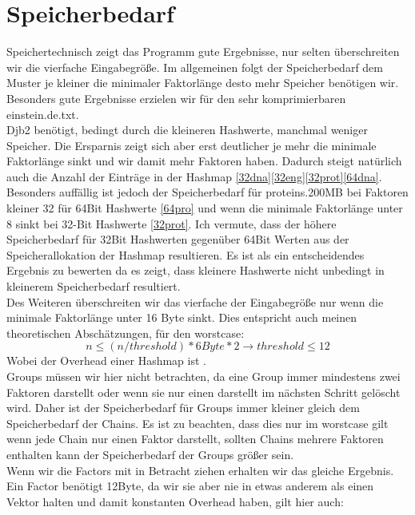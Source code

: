 \section{Speicherbedarf}

Speichertechnisch zeigt das Programm gute Ergebnisse, nur selten überschreiten wir die vierfache Eingabegröße.
Im allgemeinen folgt der Speicherbedarf dem Muster je kleiner die minimaler Faktorlänge desto mehr Speicher benötigen wir.\\
Besonders gute Ergebnisse erzielen wir für den sehr komprimierbaren einstein.de.txt.\\
Djb2 benötigt, bedingt durch die kleineren Hashwerte, manchmal weniger Speicher. Die Ersparnis zeigt sich aber erst deutlicher je mehr die minimale Faktorlänge sinkt und wir damit mehr Faktoren haben. Dadurch steigt natürlich auch die Anzahl der  Einträge in der Hashmap \ref{32dna}\ref{32eng}\ref{32prot}\ref{64dna}.\\
Besonders auffällig ist jedoch der Speicherbedarf für proteins.200MB bei Faktoren kleiner 32 für 64Bit Hashwerte \ref{64pro} und wenn die minimale Faktorlänge unter 8 sinkt bei 32-Bit Hashwerte \ref{32prot}.
Ich vermute, dass der  höhere Speicherbedarf für 32Bit Hashwerten gegenüber 64Bit Werten aus der Speicherallokation der Hashmap resultieren. Es ist als ein entscheidendes Ergebnis zu bewerten da es zeigt, dass kleinere Hashwerte nicht unbedingt in kleinerem Speicherbedarf resultiert.\\
Des Weiteren überschreiten wir das vierfache der Eingabegröße nur wenn die minimale Faktorlänge unter 16 Byte sinkt. Dies entspricht auch meinen theoretischen Abschätzungen, für den worstcase:
\begin{equation}\nonumber
	n\leq(n/threshold) * 6Byte * 2 \rightarrow  threshold\leq12
\end{equation} 
 Wobei \grqq{} der Overhead einer Hashmap ist \cite{overhead}.\\ 
Groups müssen wir hier nicht betrachten, da eine Group  immer mindestens zwei Faktoren darstellt oder wenn sie nur einen darstellt im nächsten Schritt gelöscht wird. Daher ist der Speicherbedarf für Groups immer kleiner gleich dem Speicherbedarf der Chains. Es ist zu beachten, dass dies nur im  worstcase gilt wenn jede Chain nur einen Faktor darstellt, sollten Chains mehrere Faktoren enthalten kann der Speicherbedarf der Groups größer sein.\\
Wenn wir die Factors mit in Betracht ziehen erhalten wir das gleiche Ergebnis. Ein Factor benötigt 12Byte, da wir sie aber nie in etwas anderem als einen Vektor halten und damit konstanten Overhead haben, gilt hier auch:
